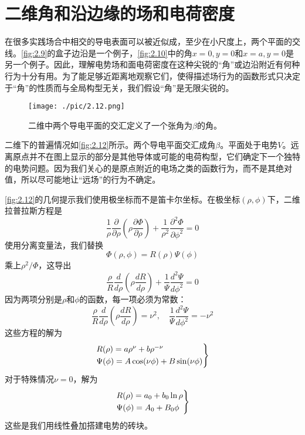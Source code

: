 \documentclass[12pt]{book}
\numberwithin{equation}{chapter}
\numberwithin{figure}{chapter}
\numberwithin{footnote}{page}
\begin{document}
\section{二维角和沿边缘的场和电荷密度}\label{sec:2.11}

在很多实践场合中相交的导电表面可以被近似成，至少在小尺度上，两个平面的交线。\autoref{fig:2.9}的盒子边沿是一个例子，\autoref{fig:2.10}中的角$x=0,y=0$和$x=a,y=0$是另一个例子。因此，理解电势场和面电荷密度在这种尖锐的“角”或边沿附近有何种行为十分有用。为了能足够近距离地观察它们，使得描述场行为的函数形式只决定于“角”的性质而与全局构型无关，我们假设“角”是无限尖锐的。

\begin{figure}[!ht]
    \centering
    \texttt{[image: ./pic/2.12.png]}
    \captionsetup{justification=raggedright, singlelinecheck=false}
    \caption{二维中两个导电平面的交汇定义了一个张角为$\beta$的角。}
    \label{fig:2.12}
\end{figure}

二维下的普遍情况如\autoref{fig:2.12}所示。两个导电平面交汇成角$\beta$。平面处于电势$V$。远离原点并不在图上显示的部分是其他导体或可能的电荷构型，它们确定下一个独特的电势问题。因为我们关心的是原点附近的电场之类的函数行为，而不是其绝对值，所以尽可能地让“远场”的行为不确定。

\autoref{fig:2.12}的几何提示我们使用极坐标而不是笛卡尔坐标。在极坐标$(\rho,\phi)$下，二维拉普拉斯方程是
\begin{equation}\label{eq:2.66}
    \frac{1}{\rho}\frac{\partial}{\partial \rho}(\rho\frac{\partial \Phi}{\partial \rho})+\frac{1}{\rho^2}\frac{\partial^2 \Phi}{\partial \phi^2}=0
\end{equation}
使用分离变量法，我们替换
$$\Phi(\rho,\phi)=R(\rho)\Psi(\phi)$$
乘上$\rho^2/\Phi$，这导出
\begin{equation}\label{eq:2.67}
    \frac{\rho}{R}\frac{d}{d \rho}(\rho\frac{d R}{d \rho})+\frac{1}{\Psi}\frac{d^2 \Psi}{d \phi^2}=0
\end{equation}
因为两项分别是$\rho$和$\phi$的函数，每一项必须为常数：
\begin{equation}\label{eq:2.68}
    \frac{\rho}{R}\frac{d}{d \rho}(\rho\frac{d R}{d \rho})=\nu^2, \quad \frac{1}{\Psi}\frac{d^2 \Psi}{d \phi^2}=-\nu^2
\end{equation}
这些方程的解为
\begin{equation}\label{eq:2.69}
    \begin{rcases*}
        R(\rho)=a\rho^\nu+b\rho^{-\nu}\\
        \Psi(\phi)=A\cos(\nu\phi)+B\sin(\nu\phi)\\
    \end{rcases*}
\end{equation}
对于特殊情况$\nu=0$，解为
\begin{equation}
    \begin{rcases*}\label{eq:2.70}
        R(\rho)=a_0+b_0\ln\rho\\
        \Psi(\phi)=A_0+B_0\phi\\
    \end{rcases*}
\end{equation}
这些是我们用线性叠加搭建电势的砖块。
\end{document}
